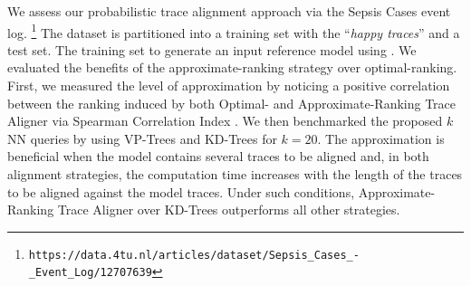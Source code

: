We assess our probabilistic trace alignment approach via the Sepsis Cases event log.%
\footnote{{\small \texttt{\tiny https://data.4tu.nl/articles/dataset/Sepsis\_Cases\_-\_Event\_Log/12707639}}} 
The dataset is partitioned into a training set with the ``\textit{happy traces}''  %
and a test set. The training set to generate an input reference model using  \cite{RoggeSoltiAW13,AugustoCDRP19}. %
We evaluated the benefits of the approximate-ranking strategy over optimal-ranking. First, we measured the level of 
approximation by noticing a positive correlation between the ranking induced by both Optimal- and Approximate-Ranking Trace 
Aligner via Spearman Correlation Index \cite{BergamiBM20}. We then benchmarked the proposed $k$NN queries by using 
VP-Trees and KD-Trees for $k=20$. The approximation is beneficial when the model contains several traces to be aligned and, in 
both alignment strategies, the computation time increases with the length of the traces to be aligned against the model traces. 
Under such conditions, Approximate-Ranking Trace Aligner over KD-Trees outperforms all other strategies.